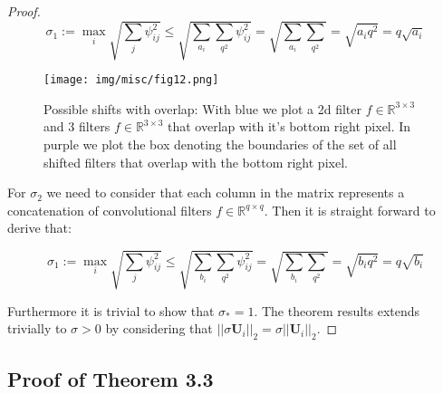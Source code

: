 \documentclass{article} %
\theoremstyle{definition}
\begin{document}
\begin{proof}
\begin{equation}
\sigma_1 := \max_i \sqrt{ \sum_j \psi_{ij}^2 } \leq  \sqrt{\sum_{a_i}\sum_{q^2} \psi_{ij}^2 }  =  \sqrt{\sum_{a_i}\sum_{q^2} } =  \sqrt{a_iq^2} =  q\sqrt{a_i}  
\end{equation}



\begin{figure}[h!]
\texttt{[image: img/misc/fig12.png]}
\centering
\caption{Possible shifts with overlap: With blue we plot a 2d filter $f \in \mathbb{R}^{3\times3}$ and 3 filters $f \in \mathbb{R}^{3\times3}$ that overlap with it's bottom right pixel. In purple we plot the box denoting the boundaries of the set of all shifted filters that overlap with the bottom right pixel.} 

\end{figure}  

For $\sigma_2$ we need to consider that each column in the matrix represents a concatenation of convolutional filters $f \in \mathbb{R}^{q \times q} $. Then it is straight forward to derive that:

\begin{equation}
\sigma_1 := \max_i \sqrt{ \sum_j \psi_{ij}^2 } \leq  \sqrt{\sum_{b_i}\sum_{q^2} \psi_{ij}^2 }  =  \sqrt{\sum_{b_i}\sum_{q^2} } =  \sqrt{b_i q^2}  =  q\sqrt{b_i}  
\end{equation}

Furthermore it is trivial to show that $\sigma_* = 1$. The theorem results extends trivially to $\sigma > 0$ by considering that $||\sigma \boldsymbol{U}_i ||_2 = \sigma||\boldsymbol{U}_i ||_2$.
\end{proof}

\subsection{Proof of Theorem 3.3}
\end{document}
